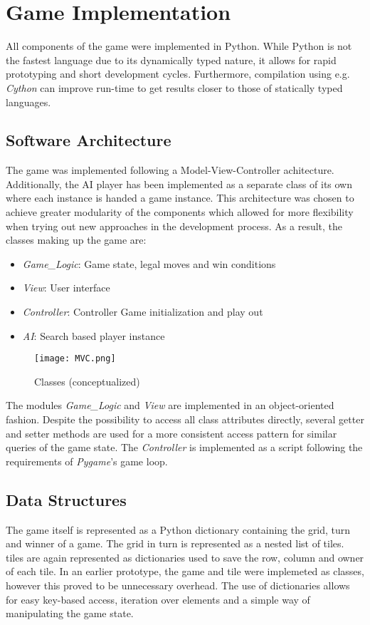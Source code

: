 \section{Game Implementation}

All components of the game were implemented in Python. While Python is not the fastest language due to its dynamically typed nature, it allows for rapid prototyping and short development cycles. Furthermore, compilation using e.g. \textit{Cython} can improve run-time to get results closer to those of statically typed languages.

\subsection{Software Architecture}

The game was implemented following a Model-View-Controller achitecture. Additionally, the AI player has been implemented as a separate class of its own where each instance is handed a game instance. This architecture was chosen to achieve greater modularity of the components which allowed for more flexibility when trying out new approaches in the development process. As a result, the classes making up the game are:

\begin{itemize}
    \item \textit{Game\_Logic}: Game state, legal moves and win conditions
    \item \textit{View}: User interface
    \item \textit{Controller}: Controller Game initialization and play out
    \item \textit{AI}: Search based player instance
\end{itemize}

\begin{figure}[h]
    \centering
    \texttt{[image: MVC.png]}
    \caption{Classes (conceptualized)}
\end{figure}

The modules \textit{Game\_Logic} and \textit{View} are implemented in an object-oriented fashion. Despite the possibility to access all class attributes directly, several getter and setter methods are used for a more consistent access pattern for similar queries of the game state. The \textit{Controller} is implemented as a script following the requirements of \textit{Pygame}'s game loop. 


\subsection{Data Structures}
The game itself is represented as a Python dictionary containing the grid, turn and winner of a game. The grid in turn is represented as a nested list of tiles. tiles are again represented as dictionaries used to save the row, column and owner of each tile. In an earlier prototype, the game and tile were implemeted as classes, however this proved to be unnecessary overhead. The use of dictionaries allows for easy key-based access, iteration over elements and a simple way of manipulating the game state.

